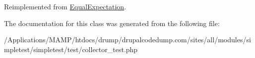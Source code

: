 Reimplemented from \hyperlink{class_equal_expectation_a412b216b1ba36e37d342aebb821ccb55}{EqualExpectation}.

The documentation for this class was generated from the following file:\begin{DoxyCompactItemize}
\item 
/Applications/MAMP/htdocs/drump/drupalcodedump.com/sites/all/modules/simpletest/simpletest/test/collector\_\-test.php\end{DoxyCompactItemize}
